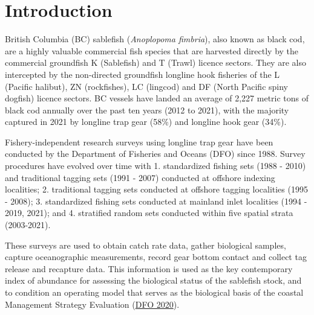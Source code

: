 \documentclass[12pt]{article}\usepackage[]{graphicx}\usepackage[]{color}
\begin{document}

\frontmatter


\renewcommand{\headrulewidth}{0.5pt}  %
\renewcommand{\footrulewidth}{0.5pt}  %

\newcommand{\lt}{\ensuremath <}
\newcommand{\gt}{\ensuremath >}

\newlength{\cslhangindent}
\setlength{\cslhangindent}{1.5em}
\newenvironment{cslreferences}%
  {}%
  {\par}

\hypertarget{sec:introduction}{%
\section{Introduction}\label{sec:introduction}}

British Columbia (BC) sablefish (\emph{Anoplopoma fimbria}), also known as black cod, are a highly valuable commercial fish species that are harvested directly by the commercial groundfish K (Sablefish) and T (Trawl) licence sectors. They are also intercepted by the non-directed groundfish longline hook fisheries of the L (Pacific halibut), ZN (rockfishes), LC (lingcod) and DF (North Pacific spiny dogfish) licence sectors. BC vessels have landed an average of 2,227 metric tons of black cod annually over the past ten years (2012 to 2021), with the majority captured in 2021 by longline trap gear (58\%) and longline hook gear (34\%).

Fishery-independent research surveys using longline trap gear have been conducted by the Department of Fisheries and Oceans (DFO) since 1988. Survey procedures have evolved over time with 1. standardized fishing sets (1988 - 2010) and traditional tagging sets (1991 - 2007) conducted at offshore indexing localities; 2. traditional tagging sets conducted at offshore tagging localities (1995 - 2008); 3. standardized fishing sets conducted at mainland inlet localities (1994 - 2019, 2021); and 4. stratified random sets conducted within five spatial strata (2003-2021).

These surveys are used to obtain catch rate data, gather biological samples, capture oceanographic measurements, record gear bottom contact and collect tag release and recapture data. This information is used as the key contemporary index of abundance for assessing the biological status of the sablefish stock, and to condition an operating model that serves as the biological basis of the coastal Management Strategy Evaluation (\protect\hyperlink{ref-DFO2020}{DFO 2020}).
\end{document}
